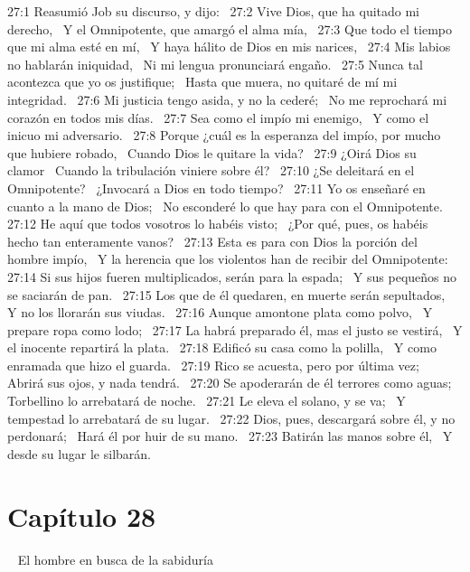 27:1 Reasumió Job su discurso, y dijo:  
27:2 Vive Dios, que ha quitado mi derecho,  
Y el Omnipotente, que amargó el alma mía,  
27:3 Que todo el tiempo que mi alma esté en mí,  
Y haya hálito de Dios en mis narices,  
27:4 Mis labios no hablarán iniquidad,  
Ni mi lengua pronunciará engaño.  
27:5 Nunca tal acontezca que yo os justifique;  
Hasta que muera, no quitaré de mí mi integridad.  
27:6 Mi justicia tengo asida, y no la cederé;  
No me reprochará mi corazón en todos mis días.  
27:7 Sea como el impío mi enemigo,  
Y como el inicuo mi adversario.  
27:8 Porque ¿cuál es la esperanza del impío, por mucho que hubiere robado,  
Cuando Dios le quitare la vida?  
27:9 ¿Oirá Dios su clamor  
Cuando la tribulación viniere sobre él?  
27:10 ¿Se deleitará en el Omnipotente?  
¿Invocará a Dios en todo tiempo?  
27:11 Yo os enseñaré en cuanto a la mano de Dios;  
No esconderé lo que hay para con el Omnipotente.  
27:12 He aquí que todos vosotros lo habéis visto;  
¿Por qué, pues, os habéis hecho tan enteramente vanos?  
27:13 Esta es para con Dios la porción del hombre impío,  
Y la herencia que los violentos han de recibir del Omnipotente:  
27:14 Si sus hijos fueren multiplicados, serán para la espada;  
Y sus pequeños no se saciarán de pan.  
27:15 Los que de él quedaren, en muerte serán sepultados,  
Y no los llorarán sus viudas.  
27:16 Aunque amontone plata como polvo,  
Y prepare ropa como lodo;  
27:17 La habrá preparado él, mas el justo se vestirá,  
Y el inocente repartirá la plata.  
27:18 Edificó su casa como la polilla,  
Y como enramada que hizo el guarda.  
27:19 Rico se acuesta, pero por última vez;  
Abrirá sus ojos, y nada tendrá.  
27:20 Se apoderarán de él terrores como aguas;  
Torbellino lo arrebatará de noche.  
27:21 Le eleva el solano, y se va;  
Y tempestad lo arrebatará de su lugar.  
27:22 Dios, pues, descargará sobre él, y no perdonará;  
Hará él por huir de su mano.  
27:23 Batirán las manos sobre él,  
Y desde su lugar le silbarán.  
\section*{Capítulo 28} 
El hombre en busca de la sabiduría  

